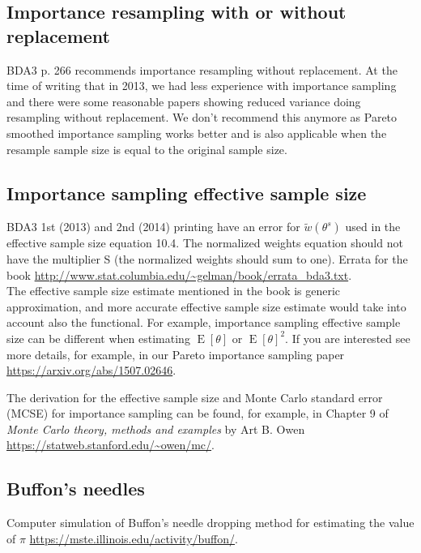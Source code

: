 \documentclass[a4paper,11pt,english]{article}
\DeclareMathOperator{\E}{E}
\begin{document}
 \subsection*{Importance resampling with or without replacement}

 BDA3 p. 266 recommends importance resampling without replacement. At
 the time of writing that in 2013, we had less experience with
 importance sampling and there were some reasonable papers showing
 reduced variance doing resampling without replacement. We don't
 recommend this anymore as Pareto smoothed importance sampling works
 better and is also applicable when the resample sample size is equal
 to the original sample size.
 
 \subsection*{Importance sampling effective sample size}
 
 {\color{red} BDA3 1st (2013) and 2nd (2014) printing have an error
   for $\tilde{w}(\theta^s)$ used in the effective sample size
   equation 10.4. The normalized weights equation should not have the
   multiplier S (the normalized weights should sum to one). Errata for
   the book
   \url{http://www.stat.columbia.edu/~gelman/book/errata_bda3.txt}.}\\

 The effective sample size estimate mentioned in the book is generic approximation, and more accurate effective sample size estimate would take into account also the functional. For example, importance sampling effective sample size can be different when estimating $\E[\theta]$ or $\E[\theta]^2$. If you are interested see more details, for example, in our Pareto importance sampling paper \url{https://arxiv.org/abs/1507.02646}.

The derivation for the effective sample size and Monte Carlo standard error (MCSE) for importance sampling can be found, for example, in Chapter 9 of \textit{Monte Carlo theory, methods and examples} by Art B. Owen \url{https://statweb.stanford.edu/~owen/mc/}.

 
 \subsection*{Buffon's needles}

 Computer simulation of Buffon's needle dropping method for estimating
 the value of $\pi$ \url{https://mste.illinois.edu/activity/buffon/}. 

 
\end{document}

